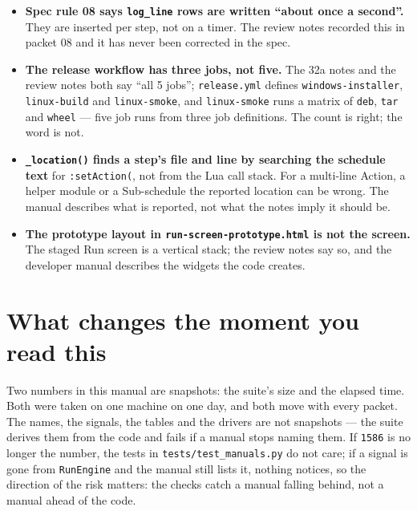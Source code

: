 \begin{itemize}
  \item \textbf{Spec rule 08 says \texttt{log\_line} rows are written ``about once a second''.}
    They are inserted per step, not on a timer. The review notes recorded this in packet 08 and it
    has never been corrected in the spec.
  \item \textbf{The release workflow has three jobs, not five.} The 32a notes and the review notes
    both say ``all 5 jobs''; \texttt{release.yml} defines \texttt{windows-installer},
    \texttt{linux-build} and \texttt{linux-smoke}, and \texttt{linux-smoke} runs a matrix of
    \texttt{deb}, \texttt{tar} and \texttt{wheel} --- five job runs from three job definitions. The
    count is right; the word is not.
  \item \textbf{\texttt{\_location()} finds a step's file and line by searching the schedule text}
    for \texttt{:setAction(}, not from the Lua call stack. For a multi-line Action, a helper module
    or a Sub-schedule the reported location can be wrong. The manual describes what is reported, not
    what the notes imply it should be.
  \item \textbf{The prototype layout in \texttt{run-screen-prototype.html} is not the screen.} The
  staged Run screen is a vertical stack; the review notes say so, and the developer manual describes
  the widgets the code creates.
\end{itemize}

\section{What changes the moment you read this}

Two numbers in this manual are snapshots: the suite's size and the elapsed time. Both were taken on
one machine on one day, and both move with every packet. The names, the signals, the tables and the
drivers are not snapshots --- the suite derives them from the code and fails if a manual stops naming
them. If \texttt{1586} is no longer the number, the tests in \texttt{tests/\allowbreak{}test\_\allowbreak{}manuals.py} do not
care; if a signal is gone from \texttt{RunEngine} and the manual still lists it, nothing notices, so
the direction of the risk matters: the checks catch a manual falling behind, not a manual ahead of
the code.

